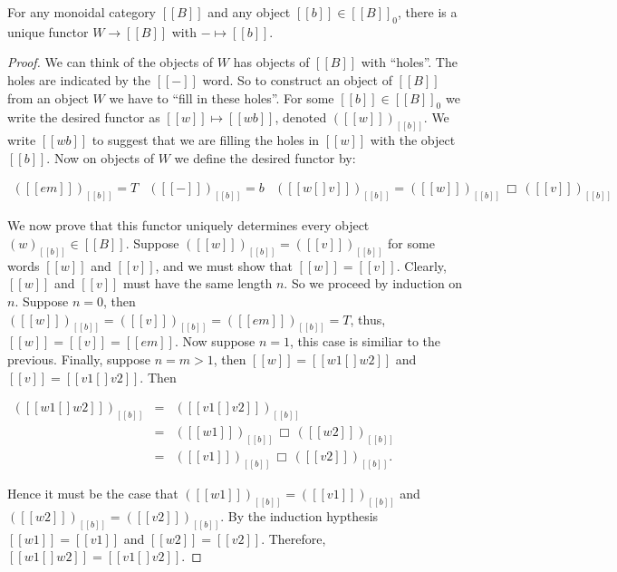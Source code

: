 \begin{theorem}
  \label{thm:the_free_monoidal_category}
  For any monoidal category $[[B]]$ and any object $[[b]] \in [[B]]_0$, there is a unique functor
  $W \to [[B]]$ with $- \mapsto [[b]]$.
\end{theorem}
\begin{proof}
  We can think of the objects of $W$ has objects of $[[B]]$ with ``holes''.  The holes are indicated
  by the $[[-]]$ word.  So to construct an object of $[[B]]$ from an object $W$ we have to ``fill
  in these holes''.  For some $[[b]] \in [[B]]_0$ we write the desired functor as $[[w]] \mapsto [[w b]]$,
  denoted $([[w]])_{[[b]]}$.  We write $[[w b]]$ to suggest that we are filling the holes in $[[w]]$ with the object $[[b]]$. Now 
  on objects of $W$ we define the desired functor by:
  \begin{center}
    \begin{math}
      \begin{array}{ccccc}
        ([[em]])_{[[b]]} = T & ([[-]])_{[[b]]} = b & ([[w [] v]])_{[[b]]} = ([[w]])_{[[b]]}\,\Box\,([[v]])_{[[b]]}
      \end{array}
    \end{math}
  \end{center}
  We now prove that this functor uniquely determines every object $(w)_[[b]] \in [[B]]$.  Suppose
  $([[w]])_{[[b]]} = ([[v]])_{[[b]]}$ for some words $[[w]]$ and $[[v]]$, and we must show that $[[w]] = [[v]]$.  
  Clearly, $[[w]]$ and $[[v]]$ must have the same length $n$.  So we proceed by induction on $n$.  Suppose
  $n = 0$, then $([[w]])_{[[b]]} = ([[v]])_{[[b]]} = ([[em]])_{[[b]]} = T$, thus, $[[w]] = [[v]] = [[em]]$. 
  Now suppose $n = 1$, this case is similiar to the previous. Finally, suppose $n = m > 1$, then 
  $[[w]] = [[w1 [] w2]]$ and $[[v]] = [[v1 [] v2]]$.  Then 
  \begin{center}
    \begin{math}
      \begin{array}{lll}
        ([[w1 [] w2]])_{[[b]]} & = & ([[v1 [] v2]])_{[[b]]}\\ 
                              & = & ([[w1]])_{[[b]]}\,\Box\,([[w2]])_{[[b]]}\\
                              & = & ([[v1]])_{[[b]]}\,\Box\,([[v2]])_{[[b]]}.
      \end{array}
    \end{math}
  \end{center}
  Hence it must be the case that $([[w1]])_{[[b]]} = ([[v1]])_{[[b]]}$ and $([[w2]])_{[[b]]} = ([[v2]])_{[[b]]}$. 
  By the induction hypthesis $[[w1]] = [[v1]]$ and $[[w2]] = [[v2]]$.  Therefore, $[[w1 [] w2]] = [[v1 [] v2]]$.


\end{proof}
